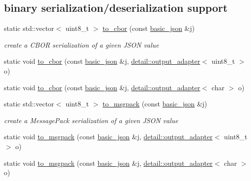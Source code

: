 \subsection*{binary serialization/deserialization support}
\begin{DoxyCompactItemize}
\item 
static std\+::vector$<$ uint8\+\_\+t $>$ \hyperlink{classnlohmann_1_1basic__json_adabcf74c9c868da3e04a5546b7705af4}{to\+\_\+cbor} (const \hyperlink{classnlohmann_1_1basic__json}{basic\+\_\+json} \&j)
\begin{DoxyCompactList}\small\item\em create a C\+B\+OR serialization of a given J\+S\+ON value \end{DoxyCompactList}\item 
static void \hyperlink{classnlohmann_1_1basic__json_a2becf604016783e5644eaa7782a08683}{to\+\_\+cbor} (const \hyperlink{classnlohmann_1_1basic__json}{basic\+\_\+json} \&j, \hyperlink{classnlohmann_1_1detail_1_1output__adapter}{detail\+::output\+\_\+adapter}$<$ uint8\+\_\+t $>$ o)
\item 
static void \hyperlink{classnlohmann_1_1basic__json_a5689672954fd3bc38f2f17e5607064c6}{to\+\_\+cbor} (const \hyperlink{classnlohmann_1_1basic__json}{basic\+\_\+json} \&j, \hyperlink{classnlohmann_1_1detail_1_1output__adapter}{detail\+::output\+\_\+adapter}$<$ char $>$ o)
\item 
static std\+::vector$<$ uint8\+\_\+t $>$ \hyperlink{classnlohmann_1_1basic__json_a99b15bcaee410426b937eacc6e47d771}{to\+\_\+msgpack} (const \hyperlink{classnlohmann_1_1basic__json}{basic\+\_\+json} \&j)
\begin{DoxyCompactList}\small\item\em create a Message\+Pack serialization of a given J\+S\+ON value \end{DoxyCompactList}\item 
static void \hyperlink{classnlohmann_1_1basic__json_aa8fe46eda86f6f92c5599c20b6c81819}{to\+\_\+msgpack} (const \hyperlink{classnlohmann_1_1basic__json}{basic\+\_\+json} \&j, \hyperlink{classnlohmann_1_1detail_1_1output__adapter}{detail\+::output\+\_\+adapter}$<$ uint8\+\_\+t $>$ o)
\item 
static void \hyperlink{classnlohmann_1_1basic__json_aca5dc0fca52131f3a634372120abfbe7}{to\+\_\+msgpack} (const \hyperlink{classnlohmann_1_1basic__json}{basic\+\_\+json} \&j, \hyperlink{classnlohmann_1_1detail_1_1output__adapter}{detail\+::output\+\_\+adapter}$<$ char $>$ o)
\item 

\end{DoxyCompactItemize}
